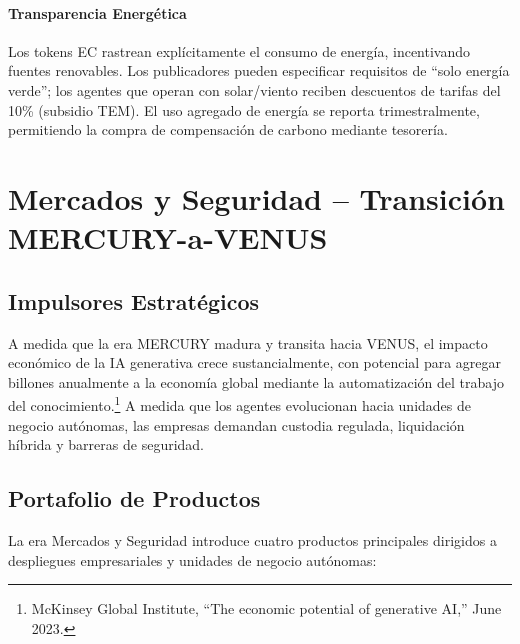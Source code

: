 \documentclass[11pt]{article}
\begin{document}
\paragraph{Transparencia Energética} Los tokens EC rastrean explícitamente el consumo de energía, incentivando fuentes renovables. Los publicadores pueden especificar requisitos de ``solo energía verde''; los agentes que operan con solar/viento reciben descuentos de tarifas del 10\% (subsidio TEM). El uso agregado de energía se reporta trimestralmente, permitiendo la compra de compensación de carbono mediante tesorería.

\section{Mercados y Seguridad -- Transición MERCURY-a-VENUS}
\subsection{Impulsores Estratégicos}
A medida que la era MERCURY madura y transita hacia VENUS, el impacto económico de la IA generativa crece sustancialmente, con potencial para agregar billones anualmente a la economía global mediante la automatización del trabajo del conocimiento.\footnote{McKinsey Global Institute, ``The economic potential of generative AI,'' June 2023.} A medida que los agentes evolucionan hacia unidades de negocio autónomas, las empresas demandan custodia regulada, liquidación híbrida y barreras de seguridad.

\subsection{Portafolio de Productos}
La era Mercados y Seguridad introduce cuatro productos principales dirigidos a despliegues empresariales y unidades de negocio autónomas:
\end{document}
